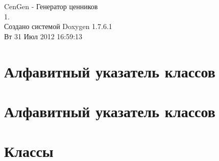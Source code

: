 \documentclass[a4paper]{book}
\begin{document}
\hypersetup{pageanchor=false,citecolor=blue}
\begin{titlepage}
\vspace*{7cm}
\begin{center}
{\Large \-Cen\-Gen -\/ Генератор ценников \\[1ex]\large 1. }\\
\vspace*{1cm}
{\large Создано системой Doxygen 1.7.6.1}\\
\vspace*{0.5cm}
{\small Вт 31 Июл 2012 16:59:13}\\
\end{center}
\end{titlepage}
\clearemptydoublepage
{}
\tableofcontents
\clearemptydoublepage
{}
\hypersetup{pageanchor=true,citecolor=blue}
\chapter{Алфавитный указатель классов}

\chapter{Алфавитный указатель классов}

\chapter{Классы}



























\printindex
\end{document}
